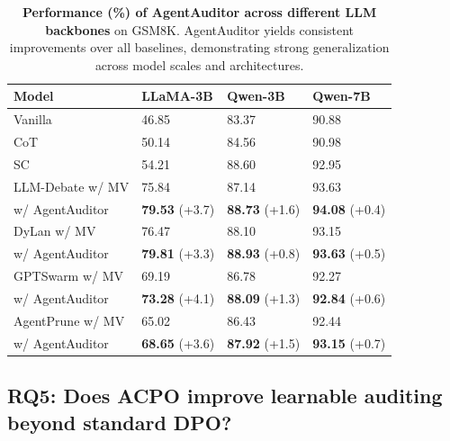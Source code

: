 \documentclass{article}
\newcommand{\cgap}[1]{\scriptsize{\color{teal}(+#1)}}
\theoremstyle{plain}
\theoremstyle{definition}
\theoremstyle{remark}
\begin{document}
\begin{table}[t]
\centering
\small
\setlength{\tabcolsep}{3pt}
\renewcommand{\arraystretch}{0.9}
\caption{\textbf{Performance (\%) of AgentAuditor across different LLM backbones} on GSM8K.
AgentAuditor yields consistent improvements over all baselines, demonstrating strong generalization across model scales and architectures.}
\label{tab:AgentAuditor_backbones}
\begin{tabular}{llll}
\textbf{Model} & \textbf{LLaMA-3B} & \textbf{Qwen-3B} & \textbf{Qwen-7B} \\
\toprule
Vanilla & 46.85 & 83.37 & 90.88 \\
CoT     & 50.14 & 84.56 & 90.98 \\
SC      & 54.21 & 88.60 & 92.95 \\
\midrule
LLM-Debate w/ MV & 75.84 & 87.14 & 93.63 \\
\cellcolor{graybg}w/ AgentAuditor  & \cellcolor{graybg}\textbf{79.53} \cgap{3.7} & \cellcolor{graybg}\textbf{88.73} \cgap{1.6} & \cellcolor{graybg}\textbf{94.08} \cgap{0.4} \\
\midrule
DyLan w/ MV & 76.47 & 88.10 & 93.15 \\
\cellcolor{graybg}w/ AgentAuditor  & \cellcolor{graybg}\textbf{79.81} \cgap{3.3} & \cellcolor{graybg}\textbf{88.93} \cgap{0.8} & \cellcolor{graybg}\textbf{93.63} \cgap{0.5} \\
\midrule
GPTSwarm w/ MV & 69.19 & 86.78 & 92.27 \\
\cellcolor{graybg}w/ AgentAuditor  & \cellcolor{graybg}\textbf{73.28} \cgap{4.1} & \cellcolor{graybg}\textbf{88.09} \cgap{1.3} & \cellcolor{graybg}\textbf{92.84} \cgap{0.6} \\
\midrule
AgentPrune w/ MV & 65.02 & 86.43 & 92.44 \\
\cellcolor{graybg}w/ AgentAuditor  & \cellcolor{graybg}\textbf{68.65} \cgap{3.6} & \cellcolor{graybg}\textbf{87.92} \cgap{1.5} & \cellcolor{graybg}\textbf{93.15} \cgap{0.7} \\
\bottomrule
\end{tabular}
\end{table}

\subsection{RQ5: Does ACPO improve learnable auditing beyond standard DPO?}
\end{document}

